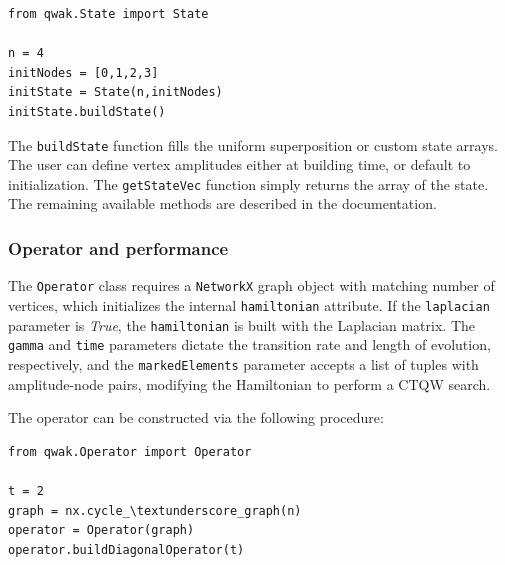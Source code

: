 \documentclass[main.tex]{subfiles}
\begin{document}
\begin{lstlisting}[style=code]
from qwak.State import State

n = 4
initNodes = [0,1,2,3]
initState = State(n,initNodes)
initState.buildState()
\end{lstlisting}

The \texttt{buildState} function fills the uniform superposition or custom
state arrays. The user can define vertex amplitudes either at
building time, or default to initialization. The \texttt{getStateVec} function
simply returns the array of the state. The remaining available methods are
described in the documentation. 


\subsubsection{Operator and performance}
The \texttt{Operator} class requires a \texttt{NetworkX} graph object with
matching number of vertices, which initializes the internal
\texttt{hamiltonian} attribute. If the \texttt{laplacian} parameter is
\textit{True}, the \texttt{hamiltonian} is built with the Laplacian matrix. The
\texttt{gamma} and \texttt{time} parameters dictate the transition rate and
length of evolution, respectively, and the \texttt{markedElements} parameter
accepts a list of tuples with amplitude-node pairs, modifying the Hamiltonian
to perform a CTQW search.\par

The operator can be constructed via the following procedure:
\begin{lstlisting}[style=code,escapeinside={__}]
from qwak.Operator import Operator 

t = 2
graph = nx.cycle_\textunderscore_graph(n)
operator = Operator(graph)
operator.buildDiagonalOperator(t)
\end{lstlisting}
\end{document}
